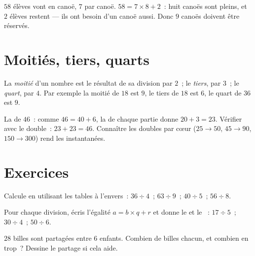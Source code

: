 \begin{example}\label{ex:g3:division:interpret}
$58$ élèves vont en canoë, $7$ par canoë.
$58 = 7 \times 8 + 2$~: huit canoës sont pleins, et $2$ élèves
restent --- ils ont besoin d'un canoë aussi. Donc $9$ canoës
doivent être réservés.
\end{example}

\section{Moitiés, tiers, quarts}

\begin{definition}\label{def:g3:division:half}
La \emph{moitié} d'un nombre est le résultat de sa division par
$2$~; le \emph{tiers}, par $3$~; le \emph{quart}, par $4$. Par
exemple la moitié de $18$ est $9$, le tiers de $18$ est $6$, le
quart de $36$ est $9$.
\end{definition}

\begin{example}\label{ex:g3:division:double}
La  de $46$~: comme $46 = 40 + 6$, la  de chaque
partie donne $20 + 3 = 23$. Vérifier avec le double~:
$23 + 23 = 46$. Connaître les doubles par cœur ($25 \to 50$,
$45 \to 90$, $150 \to 300$) rend les  instantanées.
\end{example}

\section{Exercices}

\begin{exercise}[$\star$]\label{exo:g3:division:1}
Calcule en utilisant les tables à l'envers~: $36 \div 4$~; \quad
$63 \div 9$~; \quad $40 \div 5$~; \quad $56 \div 8$.
\end{exercise}

\begin{exercise}[$\star$]\label{exo:g3:division:2}
Pour chaque division, écris l'égalité $a = b \times q + r$ et
donne le  et le ~: $17 \div 5$~; \quad $30 \div 4$~;
\quad $50 \div 6$.
\end{exercise}

\begin{exercise}[$\star$]\label{exo:g3:division:3}
$28$ billes sont partagées entre $6$ enfants. Combien de billes
chacun, et combien en trop~? Dessine le partage si cela aide.
\end{exercise}

